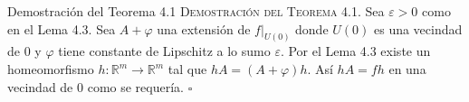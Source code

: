 \documentclass[10pt]{beamer}
\begin{document}
	\begin{frame}{Demostración del Teorema 4.1}
		\textsc{Demostración del Teorema 4.1.} Sea $\varepsilon > 0$ como en el Lema 4.3. Sea $A + \varphi$ una extensión de $f|_{U(0)}$ donde $U(0)$ es una vecindad de $0$ y $\varphi$ tiene constante de Lipschitz a lo sumo $\varepsilon$. Por el Lema 4.3 existe un homeomorfismo $h: \mathbb{R}^m \to \mathbb{R}^m$ tal que $hA = (A + \varphi)h$. Así $hA = fh$ en una vecindad de $0$ como se requería. \hfill $\square$
	\end{frame}
	
\end{document}
